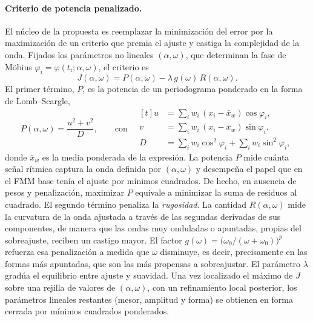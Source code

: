 \documentclass[12pt, a4paper]{report}
\begin{document}
\paragraph{Criterio de potencia penalizado.} El núcleo de la propuesta es reemplazar la minimización del error por la maximización de un criterio que premia el ajuste y castiga la complejidad de la onda. Fijados los parámetros no lineales $(\alpha,\omega)$, que determinan la fase de Möbius $\varphi_i=\varphi(t_i;\alpha,\omega)$, el criterio es
\begin{equation}
    J(\alpha,\omega) = P(\alpha,\omega) - \lambda\,g(\omega)\,R(\alpha,\omega).
    \label{eq:fmm-criterio}
\end{equation}
El primer término, $P$, es la potencia de un periodograma ponderado en la forma de Lomb--Scargle,
\begin{equation}
    P(\alpha,\omega) = \frac{u^2+v^2}{D},
    \qquad\text{con}\quad
    \begin{aligned}[t]
        u &= \sum_i w_i\,(x_i-\bar x_w)\cos\varphi_i,\\
        v &= \sum_i w_i\,(x_i-\bar x_w)\sin\varphi_i,\\
        D &= \sum_i w_i\cos^2\varphi_i + \sum_i w_i\sin^2\varphi_i,
    \end{aligned}
    \label{eq:fmm-potencia}
\end{equation}
donde $\bar x_w$ es la media ponderada de la expresión. La potencia $P$ mide cuánta señal rítmica captura la onda definida por $(\alpha,\omega)$ y desempeña el papel que en el FMM base tenía el ajuste por mínimos cuadrados. De hecho, en ausencia de pesos y penalización, maximizar $P$ equivale a minimizar la suma de residuos al cuadrado. El segundo término penaliza la \emph{rugosidad}. La cantidad $R(\alpha,\omega)$ mide la curvatura de la onda ajustada a través de las segundas derivadas de sus componentes, de manera que las ondas muy onduladas o apuntadas, propias del sobreajuste, reciben un castigo mayor. El factor $g(\omega)=\big(\omega_0/(\omega+\omega_0)\big)^{p}$ refuerza esa penalización a medida que $\omega$ disminuye, es decir, precisamente en las formas más apuntadas, que son las más propensas a sobreajustar. El parámetro $\lambda$ gradúa el equilibrio entre ajuste y suavidad. Una vez localizado el máximo de $J$ sobre una rejilla de valores de $(\alpha,\omega)$, con un refinamiento local posterior, los parámetros lineales restantes (mesor, amplitud y forma) se obtienen en forma cerrada por mínimos cuadrados ponderados.
\end{document}

